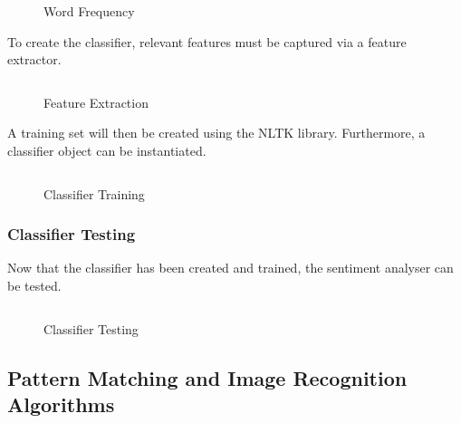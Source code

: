 \begin{figure}[h!]
  \centering
  \begin{minipage}{14cm}
    \centering
    \inputminted[fontsize=\footnotesize]{python}{inc/snippets/classifier.py}
    \caption{Word Frequency}
    \label{fig:sentiment_analysis_step2a}
  \end{minipage}
\end{figure}

To create the classifier, relevant features must be captured via a feature extractor.

\begin{figure}[h!]
  \centering
  \begin{minipage}{14cm}
    \centering
    \inputminted[fontsize=\footnotesize]{python}{inc/snippets/classifierB.py}
    \caption{Feature Extraction}
    \label{fig:sentiment_analysis_step2b}
  \end{minipage}
\end{figure}

A training set will then be created using the NLTK library. Furthermore, a classifier object can be instantiated.

\begin{figure}[h!]
  \centering
  \begin{minipage}{14cm}
    \centering
    \inputminted[fontsize=\footnotesize]{python}{inc/snippets/classifierC.py}
    \caption{Classifier Training}
    \label{fig:sentiment_analysis_step2b}
  \end{minipage}
\end{figure}

\subsubsection{Classifier Testing}

Now that the classifier has been created and trained, the sentiment analyser can be tested.

\begin{figure}[h!]
  \centering
  \begin{minipage}{14cm}
    \centering
    \inputminted[fontsize=\footnotesize]{python}{inc/snippets/classify.py}
    \caption{Classifier Testing}
    \label{fig:sentiment_analysis_step3}
  \end{minipage}
\end{figure}

\clearpage

\subsection{Pattern Matching and Image Recognition Algorithms}

